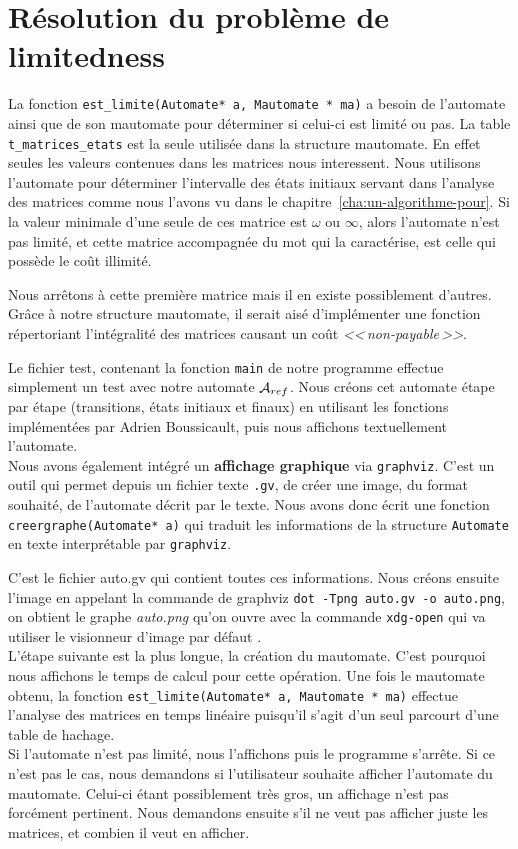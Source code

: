 \documentclass[12pt]{memoir}
\begin{document}
\section{Résolution du problème de limitedness}

La fonction \verb?est_limite(Automate* a, Mautomate * ma)? a besoin de
l'automate ainsi que de son mautomate pour déterminer si celui-ci est limité
ou pas. La table \verb?t_matrices_etats? est la seule utilisée dans la structure
mautomate. En effet seules les valeurs contenues dans les matrices nous
interessent. Nous utilisons l'automate pour déterminer l'intervalle des états
initiaux servant dans l'analyse des matrices comme nous l'avons vu dans le
chapitre~\ref{cha:un-algorithme-pour}. Si la valeur minimale d'une seule de
ces matrice est $\omega$ ou $\infty$, alors l'automate n'est pas limité, et cette
matrice accompagnée du mot qui la caractérise, est celle qui possède le coût
illimité.

Nous arrêtons à cette première matrice mais il en existe possiblement d'autres. Grâce à notre structure mautomate, il serait aisé d'implémenter une fonction répertoriant l'intégralité des matrices causant un coût \textit{<<\,non-payable\,>>}.

\medskip
Le fichier test, contenant la fonction \verb?main? de notre programme effectue simplement un test avec notre automate $\mathcal{A}_{ref}$. Nous créons cet automate étape par étape (transitions, états initiaux et finaux) en utilisant les fonctions implémentées par Adrien Boussicault, puis nous affichons textuellement l'automate. \\


Nous avons également intégré un \textbf{affichage graphique} via  \texttt{graphviz}. C'est un outil qui permet depuis un fichier
texte \texttt{.gv}, de créer une image, du format souhaité, de
l'automate décrit par le texte. Nous avons donc écrit  une fonction
\verb?creergraphe(Automate* a)? qui traduit les informations de la structure
\verb?Automate? en texte interprétable par \texttt{graphviz}.

\smallskip
C'est le fichier auto.gv qui contient toutes ces informations. Nous créons ensuite l'image en appelant la commande de graphviz  \verb?dot -Tpng auto.gv -o auto.png?, on obtient le graphe \textit{auto.png} qu'on ouvre avec la commande \verb?xdg-open? qui va utiliser le visionneur d'image par défaut .\\

L'étape suivante est la plus longue, la création du mautomate. C'est pourquoi nous affichons le temps de calcul pour cette opération. Une fois le mautomate obtenu, la fonction \verb?est_limite(Automate* a, Mautomate * ma)? effectue l'analyse des matrices en temps linéaire puisqu'il s'agit d'un seul parcourt d'une table de hachage.\\
Si l'automate n'est pas limité, nous l'affichons puis le programme s'arrête. Si ce n'est pas le cas, nous demandons si l'utilisateur souhaite afficher l'automate du mautomate. Celui-ci étant possiblement très gros, un affichage n'est pas forcément pertinent. Nous demandons ensuite s'il ne veut pas afficher juste les matrices, et combien il veut en afficher.\\
\end{document}
